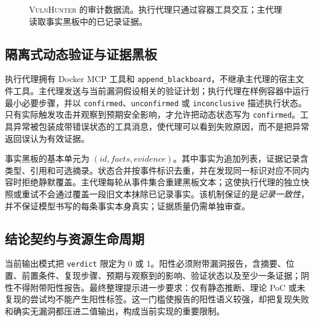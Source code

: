 \documentclass[UTF8,a4paper,11pt,fontset=fandol]{ctexart}
\newcommand{\VH}{\textsc{VulnHunter}}
\begin{document}
\begin{figure}[htbp]
\centering
{}
\caption{\VH{} 的审计数据流。执行代理只通过容器工具交互；主代理读取事实黑板中的已记录证据。}
\label{fig:architecture}
\end{figure}

\subsection{隔离式动态验证与证据黑板}
执行代理拥有 Docker MCP 工具和 \texttt{append\_blackboard}，不继承主代理的宿主文件工具。主代理发送与当前漏洞假设相关的验证计划；执行代理在样例容器中运行最小必要步骤，并以 \texttt{confirmed}、\texttt{unconfirmed} 或 \texttt{inconclusive} 描述执行状态。只有实际触发攻击并观察到预期安全影响，才允许把动态状态写为 \texttt{confirmed}。工具异常被包装成带错误状态的工具消息，使代理可以看到失败原因，而不是把异常返回误认为有效证据。

事实黑板的基本单元为 $(\mathit{id},\mathit{facts},\mathit{evidence})$。其中事实为追加列表，证据记录含类型、引用和可选摘录。状态合并按事件标识去重，并在发现同一标识对应不同内容时拒绝静默覆盖。主代理每轮从事件集合重建黑板文本；这使执行代理的独立快照或重试不会通过覆盖一段旧文本抹除已记录事实。该机制保证的是\emph{记录一致性}，并不保证模型书写的每条事实本身真实；证据质量仍需单独审查。

\subsection{结论契约与资源生命周期}
当前输出模式把 \texttt{verdict} 限定为 0 或 1。阳性必须附带漏洞报告，含摘要、位置、前置条件、复现步骤、预期与观察到的影响、验证状态以及至少一条证据；阴性不得附带阳性报告。最终整理提示进一步要求：仅有静态推断、理论 PoC 或未复现的尝试均不能产生阳性标签。这一门槛使报告的阳性语义较强，却把复现失败和确实无漏洞都压进二值输出，构成当前实现的重要限制。
\end{document}
